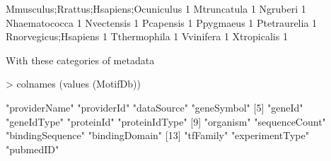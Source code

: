 \documentclass{article}
\renewenvironment{Schunk}{\vspace{\topsep}}{\vspace{\topsep}}
\begin{document}
\begin{Schunk}
\begin{Soutput}
                                        Mmusculus;Rrattus;Hsapiens;Ocuniculus 
                                                                            1 
                                                                  Mtruncatula 
                                                                            1 
                                                                     Ngruberi 
                                                                            1 
                                                                Nhaematococca 
                                                                            1 
                                                                   Nvectensis 
                                                                            1 
                                                                    Pcapensis 
                                                                            1 
                                                                    Ppygmaeus 
                                                                            1 
                                                                 Ptetraurelia 
                                                                            1 
                                                         Rnorvegicus;Hsapiens 
                                                                            1 
                                                                 Tthermophila 
                                                                            1 
                                                                    Vvinifera 
                                                                            1 
                                                                  Xtropicalis 
                                                                            1 
\end{Soutput}
\end{Schunk}

With these categories of metadata
\begin{Schunk}
\begin{Sinput}
> colnames (values (MotifDb))
\end{Sinput}
\begin{Soutput}
 [1] "providerName"    "providerId"      "dataSource"      "geneSymbol"     
 [5] "geneId"          "geneIdType"      "proteinId"       "proteinIdType"  
 [9] "organism"        "sequenceCount"   "bindingSequence" "bindingDomain"  
[13] "tfFamily"        "experimentType"  "pubmedID"       
\end{Soutput}
\end{Schunk}
\end{document}
